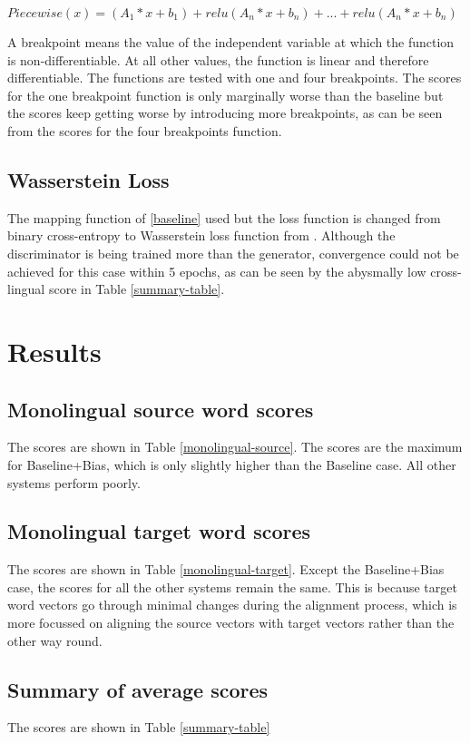 \documentclass[11pt]{article}
\begin{document}
$Piecewise(x) = (A_1*x + b_1) + relu(A_n*x + b_n) + ... + relu(A_n*x + b_n)$

A breakpoint means the value of the independent variable at which the function is non-differentiable. At all other values, the function is linear and therefore differentiable. The functions are tested with one and four breakpoints. The scores for the one breakpoint function is only marginally worse than the baseline but the scores keep getting worse by introducing more breakpoints, as can be seen from the scores for the four breakpoints function.

\subsection{Wasserstein Loss}
The mapping function of \ref{baseline} used but the loss function is changed from binary cross-entropy to Wasserstein loss function from \cite{arjovsky2017wasserstein}. Although the discriminator is being trained more than the generator, convergence could not be achieved for this case within 5 epochs, as can be seen by the abysmally low cross-lingual score in Table \ref{summary-table}.

\section{Results}
\subsection{Monolingual source word scores}
The scores are shown in Table \ref{monolingual-source}. The scores are the maximum for Baseline+Bias, which is only slightly higher than the Baseline case. All other systems perform poorly.

\subsection{Monolingual target word scores}
The scores are shown in Table \ref{monolingual-target}. Except the Baseline+Bias case, the scores for all the other systems remain the same. This is because target word vectors go through minimal changes during the alignment process, which is more focussed on aligning the source vectors with target vectors rather than the other way round.

\subsection{Summary of average scores}
The scores are shown in Table \ref{summary-table}
\end{document}
